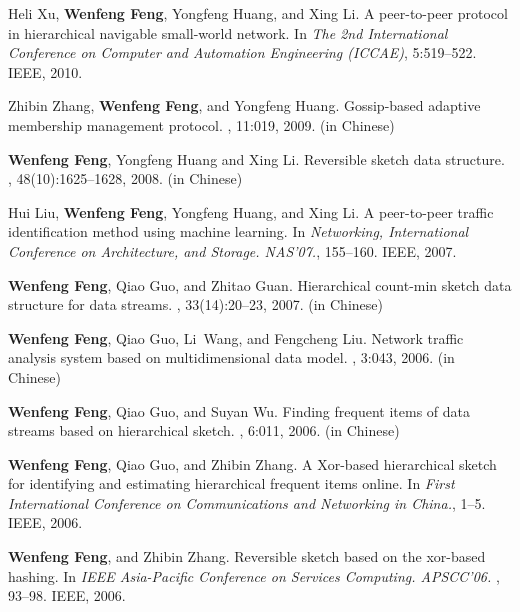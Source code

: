 \documentclass[11pt,a4paper,sans]{moderncv}        %
\begin{document}
\begin{thebibliography}{10}
Heli Xu, \textbf{Wenfeng Feng}, Yongfeng Huang, and Xing Li.
\newblock A peer-to-peer protocol in hierarchical navigable small-world
  network.
\newblock In {\em The 2nd International Conference on Computer and Automation Engineering (ICCAE)}, 5:519--522. IEEE, 2010.

Zhibin Zhang, \textbf{Wenfeng Feng}, and Yongfeng Huang.
\newblock Gossip-based adaptive membership management protocol.
, 11:019, 2009. (in Chinese)

\textbf{Wenfeng Feng}, Yongfeng Huang and Xing Li.
\newblock Reversible sketch data structure.
, 48(10):1625--1628, 2008. (in Chinese)

Hui Liu, \textbf{Wenfeng Feng}, Yongfeng Huang, and Xing Li.
\newblock A peer-to-peer traffic identification method using machine learning.
\newblock In {\em Networking, International Conference on Architecture, and Storage. NAS'07.}, 155--160. IEEE, 2007.

\textbf{Wenfeng Feng}, Qiao Guo, and Zhitao Guan.
\newblock Hierarchical count-min sketch data structure for data streams.
, 33(14):20--23, 2007. (in Chinese)

\textbf{Wenfeng Feng}, Qiao Guo, Li~Wang, and Fengcheng Liu.
\newblock Network traffic analysis system based on multidimensional data model.
, 3:043, 2006. (in Chinese)

\textbf{Wenfeng Feng}, Qiao Guo, and Suyan Wu.
\newblock Finding frequent items of data streams based on hierarchical sketch.
, 6:011, 2006. (in Chinese)

\textbf{Wenfeng Feng}, Qiao Guo, and Zhibin Zhang.
\newblock A Xor-based hierarchical sketch for identifying and estimating hierarchical frequent items online.
\newblock In {\em First International Conference on Communications and Networking in China.}, 1--5. IEEE, 2006.

\textbf{Wenfeng Feng}, and Zhibin Zhang.
\newblock Reversible sketch based on the xor-based hashing.
\newblock In {\em IEEE Asia-Pacific Conference on Services Computing. APSCC'06. }, 93--98. IEEE, 2006.

\end{thebibliography}
\end{document}
